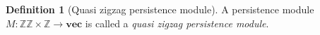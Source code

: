 \documentclass{article}
\newcommand{\qzzmod}{quasi zigzag persistence module}
\newcommand{\zz}{\mathbb{ZZ}}
\newcommand{\z}{\mathbb{Z}}
\theoremstyle{plain}
\theoremstyle{definition}
\newtheorem{definition}[theorem]{Definition}
\theoremstyle{remark}
\begin{document}




\begin{definition}[Quasi zigzag persistence module]\label{def:qzz_mod}
    A persistence module $M \colon \zz \times \z \to \mathbf{vec}$ is called a \emph{\qzzmod}. 
\end{definition}

\end{document}
